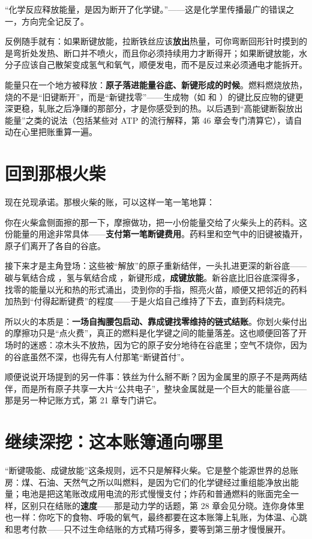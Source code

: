 \begin{wuqu}
“化学反应释放能量，是因为断开了化学键。”——这是化学里传播最广的错误之一，方向完全记反了。

反例随手就有：如果断键放能，拉断铁丝应该\textbf{放出}热量，可你弯断回形针时摸到的是弯折处发热、断口并不喷火，而且你必须持续用力才断得开；如果断键放能，水分子应该自己散架变成氢气和氧气，顺便发电，而不是反过来必须通电才能拆开。

能量只在一个地方被释放：\textbf{原子落进能量谷底、新键形成的时候}。燃料燃烧放热，烧的不是“旧键断开”，而是“新键找零”——生成物（如  和 ）的键比反应物的键更深更稳，轧账之后净赚的那部分，才是你感受到的热。以后遇到“高能键断裂放出能量”之类的说法（包括某些对 ATP 的流行解释，第 46 章会专门清算它），请自动在心里把账重算一遍。
\end{wuqu}

\section{回到那根火柴}

现在兑现承诺。那根火柴的账，可以这样一笔一笔地算：

你在火柴盒侧面擦的那一下，摩擦做功，把一小份能量交给了火柴头上的药料。这份能量的用途非常具体——\textbf{支付第一笔断键费用}。药料里和空气中的旧键被撬开，原子们离开了各自的谷底。

接下来才是主角登场：这些被“解放”的原子重新结伴，一头扎进更深的新谷底——碳与氧结合成 ，氢与氧结合成 ，新键形成，\textbf{成键放能}。新谷底比旧谷底深得多，找零的能量以光和热的形式涌出，烫到你的手指，照亮火苗，顺便又把邻近的药料加热到“付得起断键费”的程度——于是火焰自己维持了下去，直到药料烧完。

所以火的本质是：\textbf{一场自掏腰包启动、靠成键找零维持的链式结账}。你划火柴付出的摩擦功只是“点火费”，真正的燃料是化学键之间的能量落差。这也顺便回答了开场时的迷惑：凉木头不放热，因为它的原子安分地待在谷底里；空气不烧你，因为  的谷底虽然不深，也得先有人付那笔“断键首付”。

顺便说说开场提到的另一件事：铁丝为什么掰不断？因为金属里的原子不是两两结伴，而是所有原子共享一大片“公共电子”，整块金属就是一个巨大的能量谷底——那是另一种记账方式，第 21 章专门讲它。

\section{继续深挖：这本账簿通向哪里}

“断键吸能、成键放能”这条规则，远不只是解释火柴。它是整个能源世界的总账房：煤、石油、天然气之所以叫燃料，是因为它们的化学键经过重组能净放出能量；电池是把这笔账改成用电流的形式慢慢支付；炸药和普通燃料的账面完全一样，区别只在结账的\textbf{速度}——那是动力学的话题，第 28 章会见分晓。连你身体里也一样：你吃下的食物、呼吸的氧气，最终都要在这本账簿上轧账，为体温、心跳和思考付款——只不过生命结账的方式精巧得多，要等到第三册才慢慢展开。

